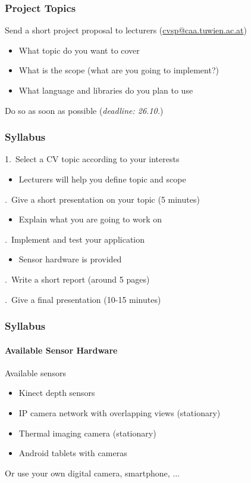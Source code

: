\documentclass[xetex,professionalfont]{beamer}
\begin{document}

\begin{frame}
\frametitle{Project Topics}

Send a short project proposal to lecturers (\url{cvsp@caa.tuwien.ac.at})
\begin{itemize}
	\item What topic do you want to cover
	\item What is the scope (what are you going to implement?)
	\item What language and libraries do you plan to use
\end{itemize}

\bigskip
Do so as soon as possible (\emph{deadline: 26.10.})

\end{frame}


\begin{frame}
\frametitle{Syllabus}

1.\ Select a CV topic according to your interests
\begin{itemize}
	\item Lecturers will help you define topic and scope
\end{itemize}

.\ Give a short presentation on your topic (5 minutes)
\begin{itemize}
	\item Explain what you are going to work on
\end{itemize}

.\ Implement and test your application
\begin{itemize}
	\item Sensor hardware is provided
\end{itemize}

.\ Write a short report (around 5 pages)

.\ Give a final presentation (10-15 minutes)

\end{frame}


\begin{frame}
\frametitle{Syllabus}
\framesubtitle{Available Sensor Hardware}

Available sensors
\begin{itemize}
	\item Kinect depth sensors
	\item IP camera network with overlapping views (stationary)
	\item Thermal imaging camera (stationary)
	\item Android tablets with cameras
\end{itemize}

\bigskip
Or use your own digital camera, smartphone, ...

\end{frame}
\end{document}
